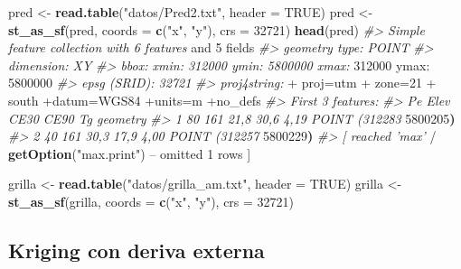 \documentclass[11pt,b5paper,]{krantz}
\newenvironment{Shaded}{}{}
\newcommand{\CommentTok}[1]{\textcolor[rgb]{0.38,0.63,0.69}{\textit{#1}}}
\newcommand{\DataTypeTok}[1]{\textcolor[rgb]{0.56,0.13,0.00}{#1}}
\newcommand{\DecValTok}[1]{\textcolor[rgb]{0.25,0.63,0.44}{#1}}
\newcommand{\ErrorTok}[1]{\textcolor[rgb]{1.00,0.00,0.00}{\textbf{#1}}}
\newcommand{\KeywordTok}[1]{\textcolor[rgb]{0.00,0.44,0.13}{\textbf{#1}}}
\newcommand{\NormalTok}[1]{#1}
\newcommand{\OperatorTok}[1]{\textcolor[rgb]{0.40,0.40,0.40}{#1}}
\newcommand{\OtherTok}[1]{\textcolor[rgb]{0.00,0.44,0.13}{#1}}
\newcommand{\StringTok}[1]{\textcolor[rgb]{0.25,0.44,0.63}{#1}}
\begin{document}
\begin{Shaded}
\begin{Highlighting}[]
\NormalTok{pred <-}\StringTok{ }\KeywordTok{read.table}\NormalTok{(}\StringTok{"datos/Pred2.txt"}\NormalTok{, }
                   \DataTypeTok{header =} \OtherTok{TRUE}\NormalTok{)}
\NormalTok{pred <-}\StringTok{ }\KeywordTok{st_as_sf}\NormalTok{(pred, }\DataTypeTok{coords =} \KeywordTok{c}\NormalTok{(}\StringTok{"x"}\NormalTok{, }\StringTok{"y"}\NormalTok{), }
                 \DataTypeTok{crs =} \DecValTok{32721}\NormalTok{)}
\KeywordTok{head}\NormalTok{(pred)}
\CommentTok{#> Simple feature collection with 6 features}
\NormalTok{and }\DecValTok{5}\NormalTok{ fields}
\CommentTok{#> geometry type: POINT}
\CommentTok{#> dimension: XY}
\CommentTok{#> bbox: xmin: 312000 ymin: 5800000 xmax:}
\DecValTok{312000}\NormalTok{ ymax}\OperatorTok{:}\StringTok{ }\DecValTok{5800000}
\CommentTok{#> epsg (SRID): 32721}
\CommentTok{#> proj4string: }
    \OperatorTok{+}\StringTok{ }\NormalTok{proj=utm }
    \OperatorTok{+}\StringTok{ }\NormalTok{zone=}\DecValTok{21} 
    \OperatorTok{+}\StringTok{ }\NormalTok{south}
\OperatorTok{+}\NormalTok{datum=WGS84 }\OperatorTok{+}\NormalTok{units=m }\OperatorTok{+}\NormalTok{no_defs}
\CommentTok{#> First 3 features:}
\CommentTok{#> Pe Elev CE30 CE90 Tg geometry}
\CommentTok{#> 1 80 161 21,8 30,6 4,19 POINT (312283}
\DecValTok{5800205}\ErrorTok{)}
\CommentTok{#> 2 40 161 30,3 17,9 4,00 POINT (312257}
\DecValTok{5800229}\ErrorTok{)}
\CommentTok{#> [ reached 'max'}
    \OperatorTok{/}\StringTok{ }\KeywordTok{getOption}\NormalTok{(}\StringTok{"max.print"}\NormalTok{) }\OperatorTok{--}
\NormalTok{omitted }\DecValTok{1}\NormalTok{ rows ]}

\NormalTok{grilla <-}\StringTok{ }\KeywordTok{read.table}\NormalTok{(}\StringTok{"datos/grilla_am.txt"}\NormalTok{, }
                     \DataTypeTok{header =} \OtherTok{TRUE}\NormalTok{)}
\NormalTok{grilla <-}\StringTok{ }\KeywordTok{st_as_sf}\NormalTok{(grilla, }\DataTypeTok{coords =} \KeywordTok{c}\NormalTok{(}\StringTok{"x"}\NormalTok{, }\StringTok{"y"}\NormalTok{), }
                   \DataTypeTok{crs =} \DecValTok{32721}\NormalTok{)}
\end{Highlighting}
\end{Shaded}

\hypertarget{kriging-con-deriva-externa}{%
\subsection{Kriging con deriva externa}\label{kriging-con-deriva-externa}}
\end{document}
